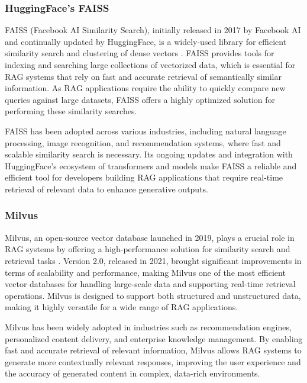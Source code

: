 \subsubsection{HuggingFace's FAISS}

FAISS (Facebook AI Similarity Search), initially released in 2017 by Facebook AI and continually updated by HuggingFace, is a widely-used library for efficient similarity search and clustering of dense vectors \cite{FAISS}. 
FAISS provides tools for indexing and searching large collections of vectorized data, which is essential for RAG systems that rely on fast and accurate retrieval of semantically similar information. 
As RAG applications require the ability to quickly compare new queries against large datasets, FAISS offers a highly optimized solution for performing these similarity searches.

FAISS has been adopted across various industries, including natural language processing, image recognition, and recommendation systems, where fast and scalable similarity search is necessary. 
Its ongoing updates and integration with HuggingFace's ecosystem of transformers and models make FAISS a reliable and efficient tool for developers building RAG applications that require real-time retrieval of relevant data to enhance generative outputs.

\subsubsection{Milvus}

Milvus, an open-source vector database launched in 2019, plays a crucial role in RAG systems by offering a high-performance solution for similarity search and retrieval tasks \cite{Milvus}. 
Version 2.0, released in 2021, brought significant improvements in terms of scalability and performance, making Milvus one of the most efficient vector databases for handling large-scale data and supporting real-time retrieval operations. 
Milvus is designed to support both structured and unstructured data, making it highly versatile for a wide range of RAG applications.

Milvus has been widely adopted in industries such as recommendation engines, personalized content delivery, and enterprise knowledge management. 
By enabling fast and accurate retrieval of relevant information, Milvus allows RAG systems to generate more contextually relevant responses, improving the user experience and the accuracy of generated content in complex, data-rich environments.


